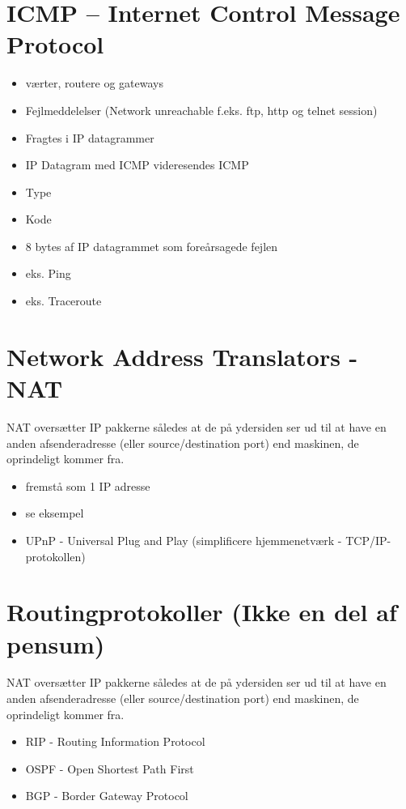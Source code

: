 \section{ICMP – Internet Control Message Protocol}
\begin{itemize}
	\item værter, routere og gateways
	\item Fejlmeddelelser (Network unreachable f.eks. ftp, http og telnet session)
	\item Fragtes i IP datagrammer
	\item IP Datagram med ICMP videresendes ICMP
	\item Type
	\item Kode
	\item 8 bytes af IP datagrammet som foreårsagede fejlen
	\item eks. Ping
	\item eks. Traceroute
\end{itemize}

\section{Network Address Translators - NAT}
NAT oversætter IP pakkerne således at de på ydersiden ser ud til at have en anden afsenderadresse (eller source/destination port) end maskinen, de oprindeligt kommer fra.
\begin{itemize}
	\item fremstå som 1 IP adresse
	\item se eksempel
	\item UPnP - Universal Plug and Play (simplificere hjemmenetværk - TCP/IP-protokollen)
\end{itemize}

\section{Routingprotokoller (Ikke en del af pensum)}
NAT oversætter IP pakkerne således at de på ydersiden ser ud til at have en anden afsenderadresse (eller source/destination port) end maskinen, de oprindeligt kommer fra.
\begin{itemize}
	\item RIP - Routing Information Protocol
	\item OSPF - Open Shortest Path First
	\item BGP - Border Gateway Protocol 
\end{itemize}
